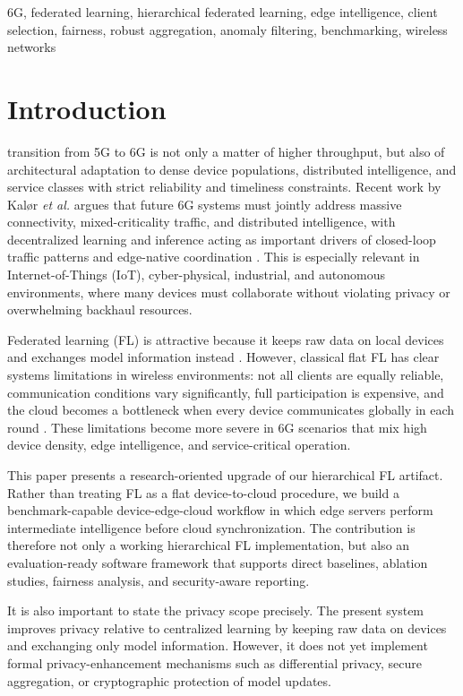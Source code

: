 \documentclass[conference]{IEEEtran}
\begin{document}
\begin{IEEEkeywords}
6G, federated learning, hierarchical federated learning, edge intelligence, client selection, fairness, robust aggregation, anomaly filtering, benchmarking, wireless networks
\end{IEEEkeywords}

\section{Introduction}
 transition from 5G to 6G is not only a matter of higher throughput, but also of architectural adaptation to dense device populations, distributed intelligence, and service classes with strict reliability and timeliness constraints. Recent work by Kal{\o}r \emph{et al.} argues that future 6G systems must jointly address massive connectivity, mixed-criticality traffic, and distributed intelligence, with decentralized learning and inference acting as important drivers of closed-loop traffic patterns and edge-native coordination \cite{kalor2025wireless6g}. This is especially relevant in Internet-of-Things (IoT), cyber-physical, industrial, and autonomous environments, where many devices must collaborate without violating privacy or overwhelming backhaul resources.

Federated learning (FL) is attractive because it keeps raw data on local devices and exchanges model information instead \cite{mcmahan2017fedavg}. However, classical flat FL has clear systems limitations in wireless environments: not all clients are equally reliable, communication conditions vary significantly, full participation is expensive, and the cloud becomes a bottleneck when every device communicates globally in each round \cite{kairouz2021advances,amiri2020wireless,chen2021joint}. These limitations become more severe in 6G scenarios that mix high device density, edge intelligence, and service-critical operation.

This paper presents a research-oriented upgrade of our hierarchical FL artifact. Rather than treating FL as a flat device-to-cloud procedure, we build a benchmark-capable device-edge-cloud workflow in which edge servers perform intermediate intelligence before cloud synchronization. The contribution is therefore not only a working hierarchical FL implementation, but also an evaluation-ready software framework that supports direct baselines, ablation studies, fairness analysis, and security-aware reporting.

It is also important to state the privacy scope precisely. The present system improves privacy relative to centralized learning by keeping raw data on devices and exchanging only model information. However, it does not yet implement formal privacy-enhancement mechanisms such as differential privacy, secure aggregation, or cryptographic protection of model updates.
\end{document}

